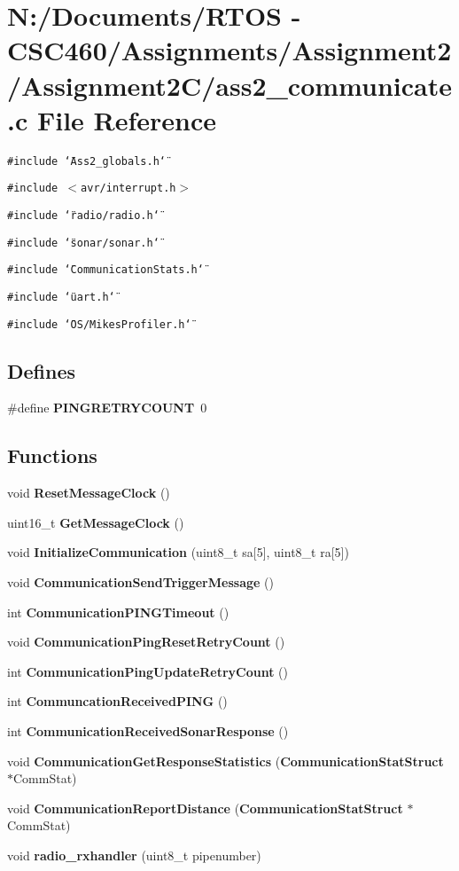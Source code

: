 \section{N:/Documents/RTOS - CSC460/Assignments/Assignment2/Assignment2C/ass2\_\-communicate.c File Reference}
\label{ass2__communicate_8c}
{\tt \#include \char`\"{}Ass2\_\-globals.h\char`\"{}}\par
{\tt \#include $<$avr/interrupt.h$>$}\par
{\tt \#include \char`\"{}radio/radio.h\char`\"{}}\par
{\tt \#include \char`\"{}sonar/sonar.h\char`\"{}}\par
{\tt \#include \char`\"{}Communication\-Stats.h\char`\"{}}\par
{\tt \#include \char`\"{}uart.h\char`\"{}}\par
{\tt \#include \char`\"{}OS/Mikes\-Profiler.h\char`\"{}}\par
\subsection*{Defines}
\begin{CompactItemize}
\item 
\#define {\bf PINGRETRYCOUNT}~0
\end{CompactItemize}
\subsection*{Functions}
\begin{CompactItemize}
\item 
void {\bf Reset\-Message\-Clock} ()
\item 
uint16\_\-t {\bf Get\-Message\-Clock} ()
\item 
void {\bf Initialize\-Communication} (uint8\_\-t sa[5], uint8\_\-t ra[5])
\item 
void {\bf Communication\-Send\-Trigger\-Message} ()
\item 
int {\bf Communication\-PINGTimeout} ()
\item 
void {\bf Communication\-Ping\-Reset\-Retry\-Count} ()
\item 
int {\bf Communication\-Ping\-Update\-Retry\-Count} ()
\item 
int {\bf Communcation\-Received\-PING} ()
\item 
int {\bf Communication\-Received\-Sonar\-Response} ()
\item 
void {\bf Communication\-Get\-Response\-Statistics} ({\bf Communication\-Stat\-Struct} $\ast$Comm\-Stat)
\item 
void {\bf Communication\-Report\-Distance} ({\bf Communication\-Stat\-Struct} $\ast$Comm\-Stat)
\item 
void {\bf radio\_\-rxhandler} (uint8\_\-t pipenumber)
\end{CompactItemize}
